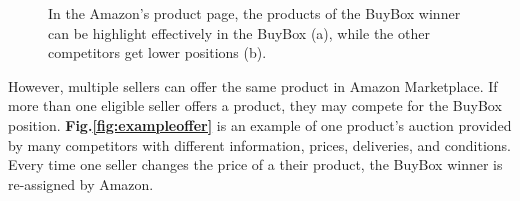 {\begin{figure}[!h]
	\begin{center}
	\end{center}
	\caption{\label{fig:buyboxexample}In the Amazon's product page, the products of the BuyBox winner can be highlight effectively in the BuyBox (a), while the other competitors get lower positions (b).}
\end{figure}


However, multiple sellers can offer the same product in Amazon Marketplace. If more than one eligible seller offers a product, they may compete for the BuyBox position. \textbf{Fig.\ref{fig:exampleoffer}} is an example of one product's auction provided by many competitors with different information, prices, deliveries, and conditions. Every time one seller changes the price of a their product, the BuyBox winner is re-assigned by Amazon. 

}
